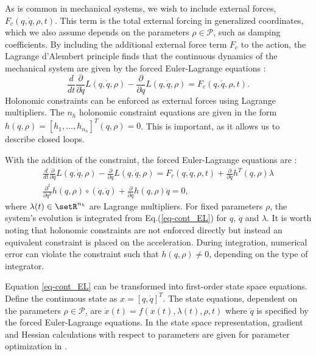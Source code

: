 \documentclass[letterpaper, 10pt, conference]{ieeeconf}
\begin{document}
As is common in mechanical systems, we wish to include external forces, $F_c(q,\dot{q},\rho,t)$.  This term is the total external forcing in generalized coordinates, which we also assume depends on the parameters $\rho\in\mathcal{P}$, such as damping coefficients.  By including the additional external force term $F_c$ to the action, the Lagrange d'Alembert principle finds that the continuous dynamics of the mechanical system are given by the forced Euler-Lagrange equations \cite{murray_li_sastry}:
\[
\frac{d}{d t}\frac{\partial}{\partial \dot{q}}L(q,\dot{q},\rho) - \frac{\partial}{\partial q}L(q,\dot{q},\rho) = F_c(q,\dot{q},\rho,t).
\]
Holonomic constraints can be enforced as external forces using Lagrange multipliers.  The $n_h$ holonomic constraint equations are given in the form $h(q,\rho)= [h_1,\ldots,h_{n_h}]^T(q,\rho) = 0$. This is important, as it allows us to describe closed loops. 

With the addition of the constraint, the forced Euler-Lagrange equations are \cite{murray_li_sastry}:
\begin{equation}
\begin{array}{c}
\frac{d}{d t}\frac{\partial}{\partial \dot{q}}L(q,\dot{q},\rho) - \frac{\partial}{\partial q}L(q,\dot{q},\rho) = F_c(q,\dot{q},\rho,t) + \frac{\partial}{\partial q}h^T(q,\rho)\lambda\\
\frac{\partial^2}{\partial q^2}h(q,\rho)\circ(\dot{q},\dot{q}) + \frac{\partial}{\partial q}h(q,\rho)\ddot{q} = 0,
\end{array}
\label{eq-cont_EL}
\end{equation}
where $\lambda(t)\in\setR^{n_h}$ are Lagrange multipliers.  For fixed parameters $\rho$, the system's evolution is integrated from Eq.(\ref{eq-cont_EL}) for $q$, $\dot{q}$ and $\lambda$.  It is worth noting that holonomic constraints are not enforced directly but instead an equivalent constraint is placed on the acceleration.  During integration, numerical error can violate the constraint such that  $h(q,\rho)\neq 0$, depending on the type of integrator.

Equation \ref{eq-cont_EL} can be transformed into first-order state space equations.  Define the continuous state as $x = [q,\dot{q}]^T$.  The state equations, dependent on the parameters $\rho\in\mathcal{P}$, are $\dot{x}(t) = f(x(t),\lambda(t),\rho,t)$ where $\ddot{q}$ is specified by the forced Euler-Lagrange equations.  In the state space representation, gradient and Hessian calculations with respect to parameters are given for parameter optimization in \cite{miller_murphey}.
\end{document}
